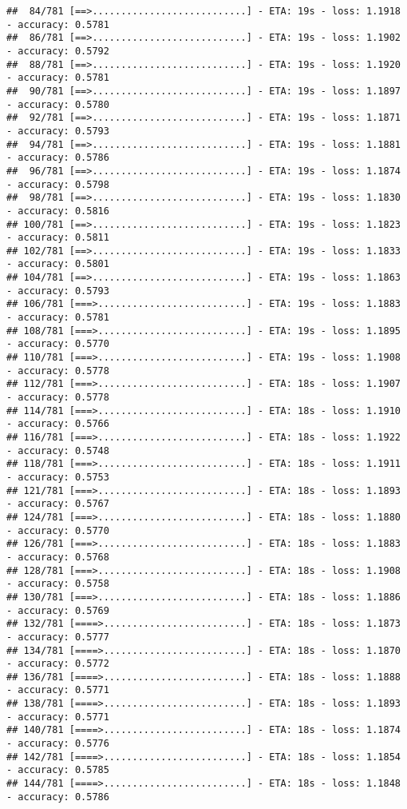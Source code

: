 \documentclass[
]{article}
\begin{document}
\begin{verbatim}
##  84/781 [==>...........................] - ETA: 19s - loss: 1.1918 - accuracy: 0.5781
##  86/781 [==>...........................] - ETA: 19s - loss: 1.1902 - accuracy: 0.5792
##  88/781 [==>...........................] - ETA: 19s - loss: 1.1920 - accuracy: 0.5781
##  90/781 [==>...........................] - ETA: 19s - loss: 1.1897 - accuracy: 0.5780
##  92/781 [==>...........................] - ETA: 19s - loss: 1.1871 - accuracy: 0.5793
##  94/781 [==>...........................] - ETA: 19s - loss: 1.1881 - accuracy: 0.5786
##  96/781 [==>...........................] - ETA: 19s - loss: 1.1874 - accuracy: 0.5798
##  98/781 [==>...........................] - ETA: 19s - loss: 1.1830 - accuracy: 0.5816
## 100/781 [==>...........................] - ETA: 19s - loss: 1.1823 - accuracy: 0.5811
## 102/781 [==>...........................] - ETA: 19s - loss: 1.1833 - accuracy: 0.5801
## 104/781 [==>...........................] - ETA: 19s - loss: 1.1863 - accuracy: 0.5793
## 106/781 [===>..........................] - ETA: 19s - loss: 1.1883 - accuracy: 0.5781
## 108/781 [===>..........................] - ETA: 19s - loss: 1.1895 - accuracy: 0.5770
## 110/781 [===>..........................] - ETA: 19s - loss: 1.1908 - accuracy: 0.5778
## 112/781 [===>..........................] - ETA: 18s - loss: 1.1907 - accuracy: 0.5778
## 114/781 [===>..........................] - ETA: 18s - loss: 1.1910 - accuracy: 0.5766
## 116/781 [===>..........................] - ETA: 18s - loss: 1.1922 - accuracy: 0.5748
## 118/781 [===>..........................] - ETA: 18s - loss: 1.1911 - accuracy: 0.5753
## 121/781 [===>..........................] - ETA: 18s - loss: 1.1893 - accuracy: 0.5767
## 124/781 [===>..........................] - ETA: 18s - loss: 1.1880 - accuracy: 0.5770
## 126/781 [===>..........................] - ETA: 18s - loss: 1.1883 - accuracy: 0.5768
## 128/781 [===>..........................] - ETA: 18s - loss: 1.1908 - accuracy: 0.5758
## 130/781 [===>..........................] - ETA: 18s - loss: 1.1886 - accuracy: 0.5769
## 132/781 [====>.........................] - ETA: 18s - loss: 1.1873 - accuracy: 0.5777
## 134/781 [====>.........................] - ETA: 18s - loss: 1.1870 - accuracy: 0.5772
## 136/781 [====>.........................] - ETA: 18s - loss: 1.1888 - accuracy: 0.5771
## 138/781 [====>.........................] - ETA: 18s - loss: 1.1893 - accuracy: 0.5771
## 140/781 [====>.........................] - ETA: 18s - loss: 1.1874 - accuracy: 0.5776
## 142/781 [====>.........................] - ETA: 18s - loss: 1.1854 - accuracy: 0.5785
## 144/781 [====>.........................] - ETA: 18s - loss: 1.1848 - accuracy: 0.5786

\end{verbatim}
\end{document}
